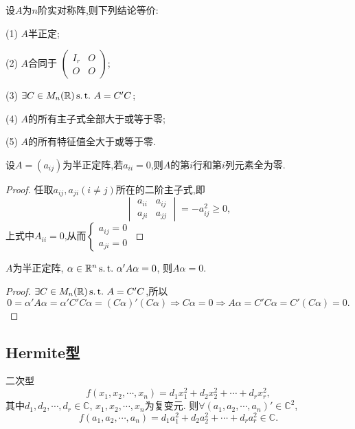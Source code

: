 \begin{theorem}
  设$A$为$n$阶实对称阵,则下列结论等价:

  (1) $A$半正定;

  (2) $A$合同于
  $\begin{pmatrix}
    I_r&O\\
    O&O
  \end{pmatrix}$;

  (3) $\exists C \in M_n(\mathbb{R}) \operatorname{{}s.t.{}} A=C'C$;

  (4) $A$的所有主子式全部大于或等于零;

  (5) $A$的所有特征值全大于或等于零.
\end{theorem}

\begin{property}
  设$A=(a_{ij})$为半正定阵,若$a_{ii}=0$,则$A$的第$i$行和第$i$列元素全为零.
\end{property}

\begin{proof}
  任取$a_{ij},a_{ji} (i\neq j)$所在的二阶主子式,即
  \[
    \begin{vmatrix}
      a_{ii}&a_{ij}\\
      a_{ji}&a_{jj}
    \end{vmatrix} = -a_{ij}^2 \geq 0,
  \]
  上式中$A_{ii}=0$,从而$
  \begin{cases}
    a_{ij}=0\\
    a_{ji}=0
  \end{cases}
  $
\end{proof}

\begin{property}
  $A$为半正定阵,
  $\alpha \in \mathbb{R}^n \operatorname{{}s.t.{}} \alpha'A\alpha=0$,
  则$A\alpha=0$.
\end{property}

\begin{proof}
  $\exists C \in M_n(\mathbb{R}) \operatorname{{}s.t.{}} A=C'C$,所以
  \[
    0 = \alpha'A\alpha = \alpha'C'C\alpha =(C\alpha)'(C\alpha)
    \Longrightarrow C\alpha=0
    \Longrightarrow A\alpha=C'C\alpha =C'(C\alpha)=0.
    \]
\end{proof}

\subsection{Hermite型}
二次型
\[ f(x_1,x_2,\cdots,x_n)=d_1x_1^2+d_2x_2^2+\cdots+d_rx_r^2, \]
其中$d_1,d_2,\cdots,d_r \in \mathbb{C}$,
$x_1,x_2,\cdots,x_n$为复变元.
则$\forall (a_1,a_2,\cdots,a_n)'\in \mathbb{C}^2$,
\[ f(a_1,a_2,\cdots,a_n)=d_1a_1^2+d_2a_2^2+\cdots+d_ra_r^2 \in \mathbb{C}. \]

